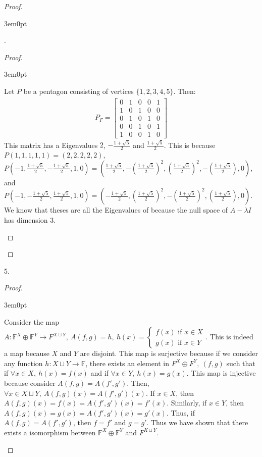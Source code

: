 \documentclass[11pt]{article}
\newcommand{\F}{\mathbb{F}}
\newenvironment{myproof}
{\begin{proof} \begin{adjustwidth}{3em}{0pt}$ $\par\nobreak\ignorespaces}
{\end{adjustwidth} \end{proof}}
\begin{document}
\begin{flushleft}
\begin{myproof}
4.

\begin{myproof}

Let $P$ be a pentagon consisting of vertices $\{1,2,3,4,5\}$. Then:
\begin{align*}
P_\Gamma = \begin{bmatrix}
0 & 1 & 0 & 0 & 1 \\
1 & 0 & 1 & 0 & 0 \\
0 & 1 & 0 & 1 & 0 \\
0 & 0 & 1 & 0 & 1 \\
1 & 0 & 0 & 1 & 0
\end{bmatrix}
\end{align*}
This matrix has a Eigenvalues $2$, $-\frac{1 + \sqrt{5}}{2}$ and $\frac{1+\sqrt{5}}{2}$. This is because $P(1,1,1,1,1) = (2,2,2,2,2)$, $P(-1, \frac{1 + \sqrt{5}}{2}, -\frac{1 + \sqrt{5}}{2}, 1, 0) = (\frac{1 + \sqrt{5}}{2}, -(\frac{1 + \sqrt{5}}{2})^2, (\frac{1 + \sqrt{5}}{2})^2, -(\frac{1 + \sqrt{5}}{2}), 0)$, and $P(-1, -\frac{1 + \sqrt{5}}{2}, \frac{1 + \sqrt{5}}{2}, 1, 0) = (-\frac{1 + \sqrt{5}}{2}, (\frac{1 + \sqrt{5}}{2})^2, -(\frac{1 + \sqrt{5}}{2})^2, (\frac{1 + \sqrt{5}}{2}), 0)$. We know that theses are all the Eigenvalues of because the null space of $A - \lambda I$ has dimension 3.

\end{myproof}

\end{myproof}

\newpage

5. 

\begin{myproof}

Consider the map $A: \F^X \oplus \F^Y \to F^{X \sqcup Y}, \ A(f,g) = h, \ h(x) = \begin{cases} f(x) \text{ if } x \in X \\ g(x) \text{ if } x \in Y \end{cases}$. This is indeed a map because $X$ and $Y$ are disjoint. This map is surjective because if we consider any function $h: X \sqcup Y \to \F$, there exists an element in $F^X \oplus F^Y, \ (f,g)$ such that if $\forall x \in X, \ h(x) = f(x)$ and if $\forall x \in Y, \ h(x) = g(x)$. This map is injective because consider $A(f,g) = A(f',g')$. Then, $\forall x \in X \sqcup Y, \ A(f,g)(x) = A(f',g')(x)$. If $x \in X$, then $A(f,g)(x) = f(x) = A(f',g')(x) = f'(x)$. Similarly, if $x \in Y$, then $A(f,g)(x) = g(x) = A(f',g')(x) = g'(x)$. Thus, if $A(f,g) = A(f',g')$, then $f=f'$ and $g=g'$. Thus we have shown that there exists a isomorphism between $\F^X \oplus \F^Y$ and $F^{X \sqcup Y}$.
\end{myproof}


\end{flushleft}
\end{document}
